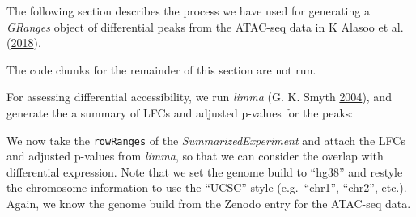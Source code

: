 \documentclass[
]{article}
\newenvironment{Shaded}{}{}
\newcommand{\DataTypeTok}[1]{\textcolor[rgb]{0.56,0.13,0.00}{#1}}
\newcommand{\KeywordTok}[1]{\textcolor[rgb]{0.00,0.44,0.13}{\textbf{#1}}}
\newcommand{\NormalTok}[1]{#1}
\newcommand{\OperatorTok}[1]{\textcolor[rgb]{0.40,0.40,0.40}{#1}}
\newcommand{\StringTok}[1]{\textcolor[rgb]{0.25,0.44,0.63}{#1}}
\begin{document}
The following section describes the process we have used for generating a
\emph{GRanges} object of differential peaks from the ATAC-seq data in K Alasoo et al. (\protect\hyperlink{ref-alasoo}{2018}).

The code chunks for the remainder of this section are not run.

For assessing differential accessibility, we run \emph{limma} (G. K. Smyth \protect\hyperlink{ref-Smyth2004}{2004}), and
generate the a summary of LFCs and adjusted p-values for the peaks:

\begin{Shaded}
\end{Shaded}

We now take the \texttt{rowRanges} of the \emph{SummarizedExperiment} and attach the LFCs
and adjusted p-values from \emph{limma}, so that we can consider the overlap with
differential expression. Note that we set the genome build to ``hg38'' and
restyle the chromosome information to use the ``UCSC'' style
(e.g.~``chr1'', ``chr2'', etc.). Again, we know the genome build from the
Zenodo entry for the ATAC-seq data.

\begin{Shaded}
\end{Shaded}
\end{document}

